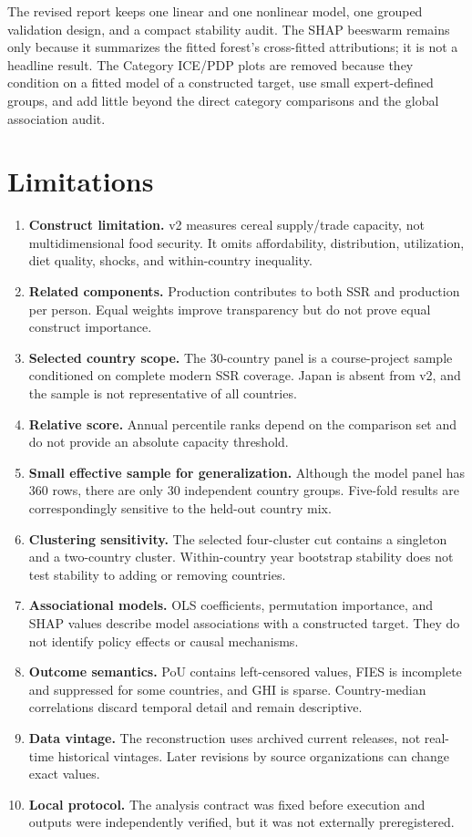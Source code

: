 \documentclass[11pt]{article}
\begin{document}
The revised report keeps one linear and one nonlinear model, one grouped validation design, and a compact stability audit. The SHAP beeswarm remains only because it summarizes the fitted forest's cross-fitted attributions; it is not a headline result. The Category ICE/PDP plots are removed because they condition on a fitted model of a constructed target, use small expert-defined groups, and add little beyond the direct category comparisons and the global association audit.

\section{Limitations}

\begin{enumerate}
  \item \textbf{Construct limitation.} v2 measures cereal supply/trade capacity, not multidimensional food security. It omits affordability, distribution, utilization, diet quality, shocks, and within-country inequality.
  \item \textbf{Related components.} Production contributes to both SSR and production per person. Equal weights improve transparency but do not prove equal construct importance.
  \item \textbf{Selected country scope.} The 30-country panel is a course-project sample conditioned on complete modern SSR coverage. Japan is absent from v2, and the sample is not representative of all countries.
  \item \textbf{Relative score.} Annual percentile ranks depend on the comparison set and do not provide an absolute capacity threshold.
  \item \textbf{Small effective sample for generalization.} Although the model panel has 360 rows, there are only 30 independent country groups. Five-fold results are correspondingly sensitive to the held-out country mix.
  \item \textbf{Clustering sensitivity.} The selected four-cluster cut contains a singleton and a two-country cluster. Within-country year bootstrap stability does not test stability to adding or removing countries.
  \item \textbf{Associational models.} OLS coefficients, permutation importance, and SHAP values describe model associations with a constructed target. They do not identify policy effects or causal mechanisms.
  \item \textbf{Outcome semantics.} PoU contains left-censored values, FIES is incomplete and suppressed for some countries, and GHI is sparse. Country-median correlations discard temporal detail and remain descriptive.
  \item \textbf{Data vintage.} The reconstruction uses archived current releases, not real-time historical vintages. Later revisions by source organizations can change exact values.
  \item \textbf{Local protocol.} The analysis contract was fixed before execution and outputs were independently verified, but it was not externally preregistered.
\end{enumerate}
\end{document}
